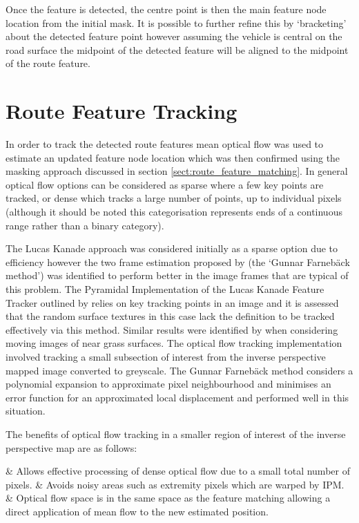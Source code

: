\documentclass[]{aiaa-tc}%
\begin{document}
Once the feature is detected, the centre point is then the main feature node location from the initial mask. It is possible to further refine this by `bracketing' about the detected feature point however assuming the vehicle is central on the road surface the midpoint of the detected feature will be aligned to the midpoint of the route feature.

\section{Route Feature Tracking}\label{s:roadFeatureTracking}

In order to track the detected route features mean optical flow was used to estimate an updated feature node location which was then confirmed using the masking approach discussed in section \ref{sect:route_feature_matching}. In general optical flow options can be considered as sparse where a few key points are tracked, or dense which tracks a large number of points, up to individual pixels (although it should be noted this categorisation represents ends of a continuous range rather than a binary category). 

The Lucas Kanade approach was considered initially as a sparse option due to efficiency however the two frame estimation proposed by \citet{opticalFlowSolution} (the `Gunnar Farneb{\"a}ck method') was identified to perform better in the image frames that are typical of this problem. The Pyramidal Implementation of the Lucas Kanade Feature Tracker outlined by \citet{opticalFlowLKPyramidal} relies on key tracking points in an image and it is assessed that the random surface textures in this case lack the definition to be tracked effectively via this method. Similar results were identified by \citet{opticalFlowLKvsDenseUAV} when considering moving images of near grass surfaces. The optical flow tracking implementation involved tracking a small subsection of interest from the inverse perspective mapped image converted to greyscale. The Gunnar Farneb{\"a}ck method considers a polynomial expansion to approximate pixel neighbourhood and minimises an error function for an approximated local displacement and performed well in this situation.

The benefits of optical flow tracking in a smaller region of interest of the inverse perspective map are as follows:
\begin{easylist}
	& Allows effective processing of dense optical flow due to a small total number of pixels.
	& Avoids noisy areas such as extremity pixels which are warped by IPM.
	& Optical flow space is in the same space as the feature matching allowing a direct application of mean flow to the new estimated position.
\end{easylist}
\end{document}
